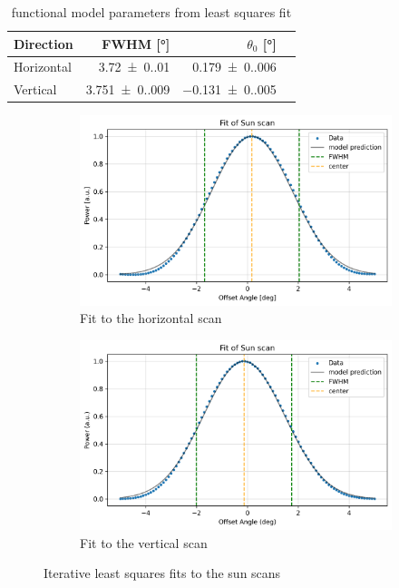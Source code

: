 \begin{table}[H]
    \centering
    \begin{tabular}{lrrr}
        \toprule
        Direction & FWHM [\si{\degree}] & $ \theta_0 $ [\si{\degree}]\\
        \midrule
        Horizontal & \SI{3.72(0.01)}{} & \SI{0.179(0.006)}{}\\
        Vertical & \SI{3.751(0.009)}{} & \SI{-0.131(0.005)}{}\\
        \bottomrule
    \end{tabular}
    \caption{functional model parameters from least squares fit}
    \label{tab:params}
\end{table}
\begin{figure}[H]
    \centering
    \begin{subfigure}[b]{0.45\textwidth}
        \centering
        \includegraphics[width=\textwidth]{assets/sun_scan_fit_h.png}
        \caption{Fit to the horizontal scan}
        \label{fig:sun_fit_h}
    \end{subfigure}
    \hfill
    \begin{subfigure}[b]{0.45\textwidth}
        \centering
        \includegraphics[width=\textwidth]{assets/sun_scan_fit_v.png}
        \caption{Fit to the vertical scan}
        \label{fig:sun_fit_v}
    \end{subfigure}
    \caption{Iterative least squares fits to the sun scans}
    \label{fig:sun_scan_fit}
\end{figure}
